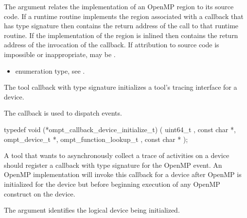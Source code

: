The  argument relates the implementation of an OpenMP region
to its source code. If a runtime routine implements the region associated with
a callback that has type signature  then
 contains the return address of the call to that runtime routine.
If the implementation of the region is inlined then  contains the
return address of the invocation of the callback. If attribution to source code
is impossible or inappropriate, may be .

\crossreferences
\begin{itemize}
\item {} enumeration type, see .
\end{itemize}



\label{sec:ompt_callback_device_initialize_t}

\summary The tool callback with type signature
 initializes a
tool's tracing interface for a device.

The  callback is used to dispatch
 events.

\format

\begin{ccppspecific}
\begin{omptCallback}
typedef void (*ompt_callback_device_initialize_t) (
  uint64_t ,
  const char *,
  ompt_device_t *,
  ompt_function_lookup_t ,
  const char *
);
\end{omptCallback}
\end{ccppspecific}


\descr

A tool that wants to asynchronously collect a trace of
activities on a device should register a callback with type signature
 for the
 OpenMP event. An OpenMP
implementation will invoke this callback for a device after OpenMP is
initialized for the device but before beginning execution of any
OpenMP construct on the device.

\argdesc

The argument  identifies the logical device
being initialized.


